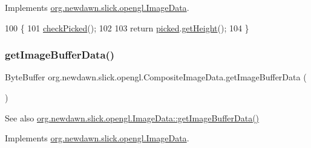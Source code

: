 Implements \mbox{\hyperlink{interfaceorg_1_1newdawn_1_1slick_1_1opengl_1_1_image_data_acce23925ae561e75f051d3287a8dda06}{org.\+newdawn.\+slick.\+opengl.\+Image\+Data}}.


\begin{DoxyCode}
100                            \{
101         \mbox{\hyperlink{classorg_1_1newdawn_1_1slick_1_1opengl_1_1_composite_image_data_a1a95487f3cd09ae6bf1458ffa1d433b8}{checkPicked}}();
102         
103         \textcolor{keywordflow}{return} \mbox{\hyperlink{classorg_1_1newdawn_1_1slick_1_1opengl_1_1_composite_image_data_a7238cbb20cc08b68a29935b4bc222da7}{picked}}.\mbox{\hyperlink{interfaceorg_1_1newdawn_1_1slick_1_1opengl_1_1_image_data_acce23925ae561e75f051d3287a8dda06}{getHeight}}();
104     \}
\end{DoxyCode}
\mbox{\label{classorg_1_1newdawn_1_1slick_1_1opengl_1_1_composite_image_data_a3f1eae47b620e0eb4172fb58a87f5894}} 
\subsubsection{\texorpdfstring{get\+Image\+Buffer\+Data()}{getImageBufferData()}}
{\footnotesize\ttfamily Byte\+Buffer org.\+newdawn.\+slick.\+opengl.\+Composite\+Image\+Data.\+get\+Image\+Buffer\+Data (\begin{DoxyParamCaption}{ }\end{DoxyParamCaption})\hspace{0.3cm}{\ttfamily [inline]}}

\begin{DoxySeeAlso}{See also}
\mbox{\hyperlink{interfaceorg_1_1newdawn_1_1slick_1_1opengl_1_1_image_data_a7b15d49f552cad075bb1179668ce5250}{org.\+newdawn.\+slick.\+opengl.\+Image\+Data\+::get\+Image\+Buffer\+Data()}} 
\end{DoxySeeAlso}


Implements \mbox{\hyperlink{interfaceorg_1_1newdawn_1_1slick_1_1opengl_1_1_image_data_a7b15d49f552cad075bb1179668ce5250}{org.\+newdawn.\+slick.\+opengl.\+Image\+Data}}.


